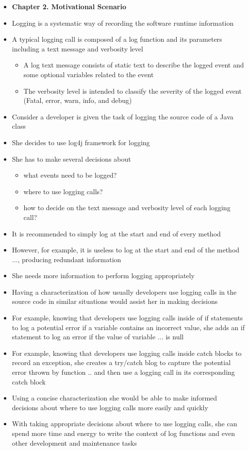 \documentclass{article}
\newcommand{\bold}{\textbf}
\begin{document}
\begin{itemize} [leftmargin=.1in]
\item \bold{Chapter 2. Motivational Scenario}
\item Logging is a systematic way of recording the software runtime information
\item A typical logging call is composed of a log function and its parameters including a text message and verbosity level
\begin{itemize}
\item A log text message consists of static text to describe the logged event
and some optional variables related to the event
\item The verbosity level is intended to classify the
severity of the logged event (Fatal, error, warn, info, and debug)
\end{itemize}
\item Consider a developer is given the task of logging the source code of a Java class
\item She decides to use log4j framework for logging
\item She has to make several decisions about
\begin{itemize}
\item what events need to be logged?
\item where to use logging calls?
\item how to decide on the text message and verbosity level of each logging call?
\end{itemize}
\item It is recommended to simply log at the start and end of every method
\item However, for example, it is useless to log at the start and end of the method ..., producing redundant information
\item She needs more information to perform logging appropriately
\item Having a characterization  of how usually developers use logging calls in the source code in similar situations would assist her in making decisions
\item For example, knowing that developers use logging calls inside of if statements to log a potential error if a variable contains an incorrect value, she adds an if statement to log an error if the value of variable ... is null
\item For example, knowing that developers use logging calls inside catch blocks to record an exception, she creates a try/catch blog to capture the potential error thrown by function .. and then use a logging call in its corresponding catch block
\item Using a concise characterization she would be able to make informed decisions about where to use logging calls more easily and quickly
\item With taking appropriate decisions about where to use logging calls, she can spend more time and energy to write the context of log functions and even other development and maintenance tasks


\end{itemize}
\end{document}
